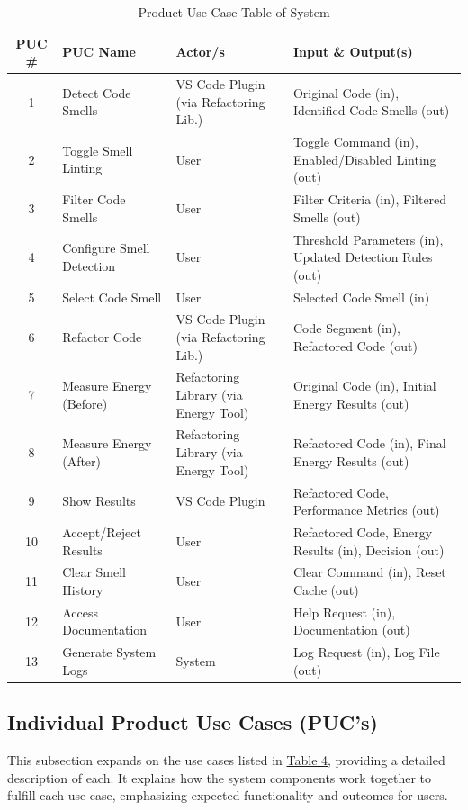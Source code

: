 \documentclass[12pt]{article}
\begin{document}
\setlength\extrarowheight{2mm}

\begin{table}[H]
  \centering
  \renewcommand{\arraystretch}{0.85} 
  \begin{tabularx}{\textwidth}{|c|
      >{\raggedright\arraybackslash}X|
      >{\raggedright\arraybackslash}p{1.1in}| 
    >{\raggedright\arraybackslash}X|}
    \toprule \textbf{PUC \#} & \textbf{PUC Name} & \textbf{Actor/s} &
    \textbf{Input \& Output(s)} \\
    \midrule
    1 & Detect Code Smells & VS Code Plugin (via Refactoring Lib.) & Original Code (in), Identified Code Smells (out) \\
    2 & Toggle Smell Linting & User & Toggle Command (in), Enabled/Disabled Linting (out) \\
    3 & Filter Code Smells & User & Filter Criteria (in), Filtered Smells (out) \\
    4 & Configure Smell Detection & User & Threshold Parameters (in), Updated Detection Rules (out) \\
    5 & Select Code Smell & User & Selected Code Smell (in) \\
    6 & Refactor Code & VS Code Plugin (via Refactoring Lib.) & Code Segment (in), Refactored Code (out) \\
    7 & Measure Energy (Before) & Refactoring Library (via Energy Tool) & Original Code (in), Initial Energy Results (out) \\
    8 & Measure Energy (After) & Refactoring Library (via Energy Tool) & Refactored Code (in), Final Energy Results (out) \\
    9 & Show Results & VS Code Plugin & Refactored Code, Performance Metrics (out) \\
    10 & Accept/Reject Results & User & Refactored Code, Energy Results (in), Decision (out) \\
    11 & Clear Smell History & User & Clear Command (in), Reset Cache (out) \\
    12 & Access Documentation & User & Help Request (in), Documentation (out) \\
    13 & Generate System Logs & System & Log Request (in), Log File (out) \\
    \bottomrule
  \end{tabularx}
  \caption{Product Use Case Table of System}
  \label{tab:puc}
  \vspace{-2mm} 
\end{table}

\subsection{Individual Product Use Cases (PUC's)}
This subsection expands on the use cases listed in
\hyperref[tab:puc]{Table 4}, providing a detailed description of
each. It explains how the system components work together to fulfill
each use case, emphasizing expected functionality and outcomes for users.
\end{document}
